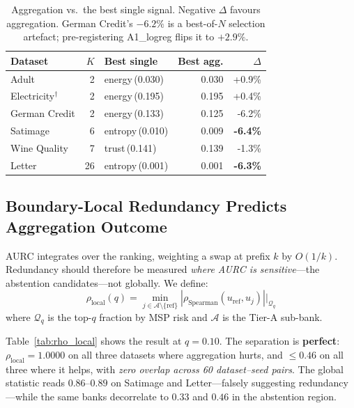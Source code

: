 \documentclass[conference]{IEEEtran}
\newcommand{\rholocal}{\rho_{\mathrm{local}}}
\begin{document}
\begin{table}[t]
\centering
\caption{Aggregation vs.\ the best single signal. Negative $\Delta$ favours aggregation. German Credit's $-6.2\%$ is a best-of-$N$ selection artefact; pre-registering A1\_logreg flips it to $+2.9\%$.}
\label{tab:agg_vs_single}
\begin{tabular}{l r l r r}
\toprule
Dataset & $K$ & Best single & Best agg. & $\Delta$ \\
\midrule
Adult & 2 & energy\,(0.030) & 0.030 & +0.9\% \\
Electricity$^{\dagger}$ & 2 & energy\,(0.195) & 0.195 & +0.4\% \\
German Credit & 2 & energy\,(0.133) & 0.125 & -6.2\% \\
Satimage & 6 & entropy\,(0.010) & 0.009 & \textbf{-6.4\%} \\
Wine Quality & 7 & trust\,(0.141) & 0.139 & -1.3\% \\
Letter & 26 & entropy\,(0.001) & 0.001 & \textbf{-6.3\%} \\
\bottomrule
\end{tabular}
\end{table}

\subsection{Boundary-Local Redundancy Predicts Aggregation Outcome}
\label{sec:mechanism}

AURC integrates over the ranking, weighting a swap at prefix $k$ by $O(1/k)$. Redundancy should therefore be measured \emph{where AURC is sensitive}---the abstention candidates---not globally. We define:
\begin{equation}
  \rholocal(q) = \min_{j \in \mathcal{A} \setminus \{\mathrm{ref}\}} |\rho_{\mathrm{Spearman}}(u_{\mathrm{ref}}, u_j)| \Big|_{\mathcal{Q}_q}
  \label{eq:rholocal}
\end{equation}
where $\mathcal{Q}_q$ is the top-$q$ fraction by MSP risk and $\mathcal{A}$ is the Tier-A sub-bank.

Table~\ref{tab:rho_local} shows the result at $q{=}0.10$. The separation is \textbf{perfect}: $\rholocal = 1.0000$ on all three datasets where aggregation hurts, and $\le 0.46$ on all three where it helps, with \emph{zero overlap across 60 dataset--seed pairs}. The global statistic reads $0.86$--$0.89$ on Satimage and Letter---falsely suggesting redundancy---while the same banks decorrelate to $0.33$ and $0.46$ in the abstention region.
\end{document}
